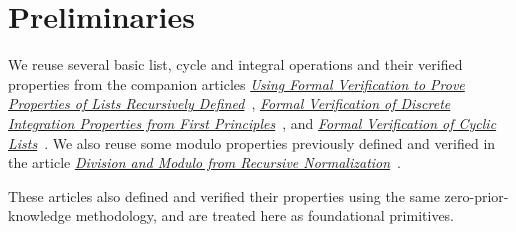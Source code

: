 \section{Preliminaries}

We reuse several basic list, cycle and integral operations and their verified
properties from the companion articles
\href{https://rxiverse.org/abs/2609.0023}{\emph{Using
Formal Verification to Prove Properties of Lists Recursively Defined}}~\cite{mata2026lists},
\href{https://doi.org/10.5281/zenodo.22746792}{\emph{Formal
Verification of Discrete Integration Properties from First Principles}}~\cite{mata2026integral},
and
\href{https://doi.org/10.5281/zenodo.22865441}{\emph{Formal
Verification of Cyclic Lists}}~\cite{mata2026cycle}.
We also reuse some modulo properties previously defined and verified in the
article
\href{http://ai.viXra.org/abs/2609.0009}{\emph{Division and Modulo from
Recursive Normalization}}~\cite{mata2026modulo}.

These articles also defined and verified their properties using the same
zero-prior-knowledge methodology, and are treated here as foundational
primitives.

